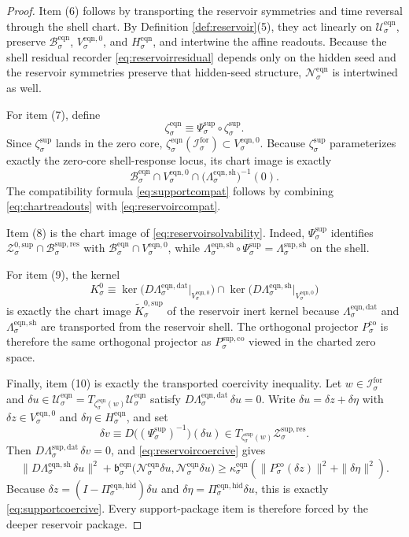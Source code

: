 \documentclass[11pt]{article}
\newcommand{\ForSpace}[1]{\mathcal I_{#1}^{\mathrm{for}}}
\newcommand{\Kernel}[1]{K_{#1}^{0}}
\newcommand{\StateComp}[1]{P_{#1}^{\mathrm{co}}}
\newcommand{\EqnSpace}[1]{\mathcal U_{#1}^{\mathrm{eqn}}}
\newcommand{\EqnBody}[1]{\mathcal B_{#1}^{\mathrm{eqn}}}
\newcommand{\EqnData}[1]{\Lambda_{#1}^{\mathrm{eqn,dat}}}
\newcommand{\EqnShell}[1]{\Lambda_{#1}^{\mathrm{eqn,sh}}}
\newcommand{\EqnPair}[1]{\mathfrak b_{#1}^{\mathrm{eqn}}}
\newcommand{\EqnZero}[1]{V_{#1}^{\mathrm{eqn},0}}
\newcommand{\EqnHidden}[1]{H_{#1}^{\mathrm{eqn}}}
\newcommand{\EqnProj}[1]{\Pi_{#1}^{\mathrm{eqn,hid}}}
\newcommand{\EqnLin}[1]{\mathcal N_{#1}^{\mathrm{eqn}}}
\newcommand{\EqnEmbed}[1]{\zeta_{#1}^{\mathrm{eqn}}}
\newcommand{\ResBody}[1]{\mathcal B_{#1}^{\mathrm{sup,res}}}
\newcommand{\ResShellSet}[1]{\mathcal Z_{#1}^{\mathrm{sup,res}}}
\newcommand{\ResData}[1]{\Lambda_{#1}^{\mathrm{sup,dat}}}
\newcommand{\ResShellMap}[1]{\Lambda_{#1}^{\mathrm{sup,sh}}}
\newcommand{\ResZeroCore}[1]{\mathcal Z_{#1}^{0,\mathrm{sup}}}
\newcommand{\ShellChart}[1]{\Psi_{#1}^{\mathrm{sup}}}
\newcommand{\ResEmbed}[1]{\zeta_{#1}^{\mathrm{sup}}}
\newcommand{\ResKernelCh}[1]{\widetilde K_{#1}^{0,\mathrm{sup}}}
\newcommand{\ResStateComp}[1]{P_{#1}^{\mathrm{sup,co}}}
\begin{document}
\begin{proof}
Item (6) follows by transporting the reservoir symmetries and time reversal through the shell chart. By Definition \ref{def:reservoir}(5), they act linearly on \(\EqnSpace{\sigma}\), preserve \(\EqnBody{\sigma}\), \(\EqnZero{\sigma}\), and \(\EqnHidden{\sigma}\), and intertwine the affine readouts. Because the shell residual recorder \eqref{eq:reservoirresidual} depends only on the hidden seed and the reservoir symmetries preserve that hidden-seed structure, \(\EqnLin{\sigma}\) is intertwined as well.

For item (7), define
\[
\EqnEmbed{\sigma}
\equiv
\ShellChart{\sigma}\circ\ResEmbed{\sigma}.
\]
Since \(\ResEmbed{\sigma}\) lands in the zero core, \(\EqnEmbed{\sigma}(\ForSpace{\sigma})\subset\EqnZero{\sigma}\). Because \(\ResEmbed{\sigma}\) parameterizes exactly the zero-core shell-response locus, its chart image is exactly
\[
\EqnBody{\sigma}\cap\EqnZero{\sigma}\cap\bigl(\EqnShell{\sigma}\bigr)^{-1}(0).
\]
The compatibility formula \eqref{eq:supportcompat} follows by combining \eqref{eq:chartreadouts} with \eqref{eq:reservoircompat}.

Item (8) is the chart image of \eqref{eq:reservoirsolvability}. Indeed, \(\ShellChart{\sigma}\) identifies \(\ResZeroCore{\sigma}\cap\ResBody{\sigma}\) with \(\EqnBody{\sigma}\cap\EqnZero{\sigma}\), while \(\EqnShell{\sigma}\circ\ShellChart{\sigma}=\ResShellMap{\sigma}\) on the shell.

For item (9), the kernel
\[
\Kernel{\sigma}
\equiv
\ker\bigl(D\EqnData{\sigma}\big|_{\EqnZero{\sigma}}\bigr)
\cap
\ker\bigl(D\EqnShell{\sigma}\big|_{\EqnZero{\sigma}}\bigr)
\]
is exactly the chart image \(\ResKernelCh{\sigma}\) of the reservoir inert kernel because \(\EqnData{\sigma}\) and \(\EqnShell{\sigma}\) are transported from the reservoir shell. The orthogonal projector \(\StateComp{\sigma}\) is therefore the same orthogonal projector as \(\ResStateComp{\sigma}\) viewed in the charted zero space.

Finally, item (10) is exactly the transported coercivity inequality. Let \(w\in\ForSpace{\sigma}\) and \(\delta u\in\EqnSpace{\sigma}=T_{\EqnEmbed{\sigma}(w)}\EqnSpace{\sigma}\) satisfy \(D\EqnData{\sigma}\,\delta u=0\). Write \(\delta u=\delta z+\delta\eta\) with \(\delta z\in\EqnZero{\sigma}\) and \(\delta\eta\in\EqnHidden{\sigma}\), and set
\[
\delta v\equiv D\bigl((\ShellChart{\sigma})^{-1}\bigr)(\delta u)
\in
T_{\ResEmbed{\sigma}(w)}\ResShellSet{\sigma}.
\]
Then \(D\ResData{\sigma}\,\delta v=0\), and \eqref{eq:reservoircoercive} gives
\[
\|D\EqnShell{\sigma}\,\delta u\|^{2}
+
\EqnPair{\sigma}\bigl(\EqnLin{\sigma}\delta u,\EqnLin{\sigma}\delta u\bigr)
\ge
\kappa_{\sigma}^{\mathrm{eqn}}
\left(
\|\StateComp{\sigma}(\delta z)\|^{2}
+
\|\delta\eta\|^{2}
\right).
\]
Because \(\delta z=(I-\EqnProj{\sigma})\delta u\) and \(\delta\eta=\EqnProj{\sigma}\delta u\), this is exactly \eqref{eq:supportcoercive}. Every support-package item is therefore forced by the deeper reservoir package.
\end{proof}
\end{document}
